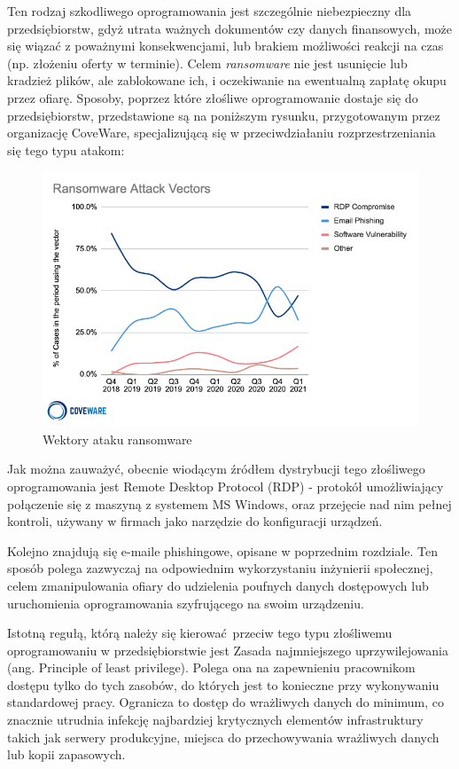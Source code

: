 \documentclass[12pt,twoside]{article}
\begin{document}
Ten rodzaj szkodliwego oprogramowania jest szczególnie niebezpieczny dla przedsiębiorstw, gdyż utrata ważnych dokumentów czy danych finansowych, może się wiązać z poważnymi konsekwencjami, lub brakiem możliwości reakcji na czas (np. złożeniu oferty w terminie). Celem \emph{ransomware} nie jest usunięcie lub kradzież plików, ale zablokowane ich, i oczekiwanie na ewentualną zapłatę okupu przez ofiarę. Sposoby, poprzez które złośliwe oprogramowanie dostaje się do przedsiębiorstw, przedstawione są na poniższym rysunku, przygotowanym przez organizację CoveWare, specjalizującą się w przeciwdziałaniu rozprzestrzeniania się tego typu atakom:
\begin{figure}[H]
	\centering
	\includegraphics[width=0.77\linewidth]{figures/ransomware-attack-vectors.png}
	\caption{Wektory ataku ransomware  \cite{RansomwareAttackVectors}} 
	\label{Fig:Wektory ataku ransomware}
\end{figure} 

Jak można zauważyć, obecnie wiodącym źródłem dystrybucji tego złośliwego oprogramowania jest Remote Desktop Protocol (RDP) \cite{RDP} - protokół umożliwiający połączenie się z maszyną z systemem MS Windows, oraz przejęcie nad nim pełnej kontroli, używany w firmach jako narzędzie do konfiguracji urządzeń. 

Kolejno znajdują się e-maile phishingowe, opisane w poprzednim rozdziale. Ten sposób polega zazwyczaj na odpowiednim wykorzystaniu inżynierii społecznej, celem zmanipulowania ofiary do udzielenia poufnych danych dostępowych lub uruchomienia oprogramowania szyfrującego na swoim urządzeniu.  

Istotną regułą, którą należy się kierować przeciw tego typu złośliwemu oprogramowaniu w przedsiębiorstwie jest Zasada najmniejszego uprzywilejowania (ang. Principle of least privilege). Polega ona na zapewnieniu pracownikom dostępu tylko do tych zasobów, do których jest to konieczne przy wykonywaniu standardowej pracy. Ogranicza to dostęp do wrażliwych danych do minimum, co znacznie utrudnia infekcję najbardziej krytycznych elementów infrastruktury takich jak serwery produkcyjne, miejsca do przechowywania wrażliwych danych lub kopii zapasowych. 
\end{document}
